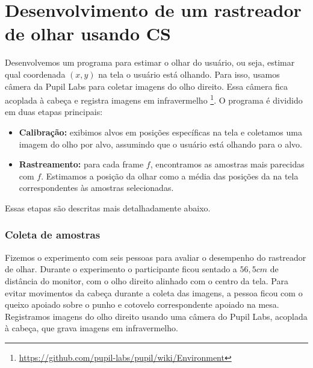 \chapter{Desenvolvimento de um rastreador de olhar usando CS}

Desenvolvemos um programa para estimar o olhar do usuário, ou seja, estimar qual coordenada $(x,y)$ na tela o usuário está olhando. Para isso, usamos câmera da Pupil Labs para coletar imagens do olho direito. Essa câmera fica acoplada à cabeça e registra imagens em infravermelho \footnote{\url{https://github.com/pupil-labs/pupil/wiki/Environment}}. O programa é dividido em duas etapas principais:

\begin{itemize}
\item {\bf Calibração:} exibimos alvos em posições específicas na tela e coletamos uma imagem do olho por alvo, assumindo que o usuário está olhando para o alvo.

\item {\bf Rastreamento:} para cada frame $f$, encontramos as amostras mais parecidas com $f$. Estimamos a posição da olhar como a média das posições da na tela correspondentes às amostras selecionadas.
\end{itemize}

Essas etapas são descritas mais detalhadamente abaixo.

\subsection{Coleta de amostras}


Fizemos o experimento com seis pessoas para avaliar o desempenho do rastreador de olhar. Durante o experimento o participante ficou sentado a $56,5cm$ de distância do monitor, com o olho direito alinhado com o centro da tela. Para evitar movimentos da cabeça durante a coleta das imagens, a pessoa ficou com o queixo apoiado sobre o punho e cotovelo correspondente apoiado na mesa. Registramos imagens do olho direito usando uma câmera do Pupil Labs, acoplada à cabeça, que grava imagens em infravermelho.

